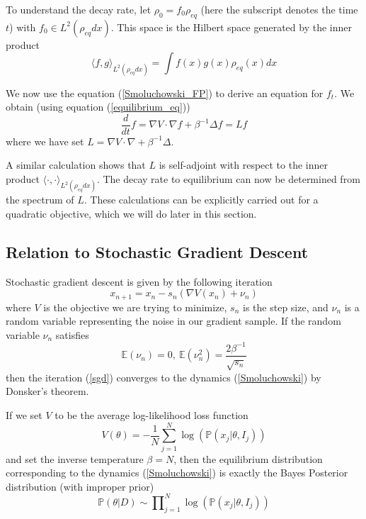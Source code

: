 To understand the decay rate, let $\rho_0 = f_0\rho_{eq}$ (here the subscript denotes the time $t$) with $f_0\in L^2(\rho_{eq}dx)$.
This space is the Hilbert space generated by the inner product
\begin{equation}
 \langle f,g\rangle_{L^2(\rho_{eq}dx)} = \int f(x)g(x)\rho_{eq}(x)dx
\end{equation}

We now use the equation (\ref{Smoluchowski_FP}) to derive an equation for $f_t$. We obtain (using equation (\ref{equilibrium_eq}))
\begin{equation}
 \frac{d}{dt} f = \nabla V\cdot\nabla f + \beta^{-1}\Delta f = Lf
\end{equation}
where we have set $L = \nabla V\cdot\nabla  + \beta^{-1}\Delta$.

A similar calculation shows that $L$ is self-adjoint with respect to the inner product 
$\langle \cdot, \cdot\rangle_{L^2(\rho_{eq}dx)}$. The decay rate to equilibrium can now be determined from 
the spectrum of $L$. These calculations can be explicitly carried out for a quadratic objective, which we will
do later in this section.

\subsection{Relation to Stochastic Gradient Descent}
Stochastic gradient descent is given by the following iteration
\begin{equation}\label{sgd}
 x_{n+1} = x_n - s_n(\nabla V(x_n) + \nu_n)
\end{equation}
where $V$ is the objective we are trying to minimize, $s_n$ is the step size, and $\nu_n$ is a random variable
representing the noise in our gradient sample. If the random variable $\nu_n$ satisfies
\begin{equation}
 \mathbb{E}(\nu_n) = 0,~\mathbb{E}(\nu_n^2) = \frac{2\beta^{-1}}{\sqrt{s_n}}
\end{equation}
then the iteration (\ref{sgd}) converges to the dynamics (\ref{Smoluchowski}) by Donsker's theorem.

If we set $V$ to be the average log-likelihood loss function
\begin{equation}
 V(\theta) = -\frac{1}{N}\displaystyle\sum_{j = 1}^N \log(\mathbb{P}(x_j|\theta,I_j))
\end{equation}
and set the inverse temperature $\beta = N$, then the equilibrium distribution corresponding to the
dynamics (\ref{Smoluchowski}) is exactly the Bayes Posterior distribution (with improper prior)
$$\mathbb{P}(\theta|D) \sim \mathbb\prod_{j = 1}^N \log(\mathbb{P}(x_j|\theta,I_j))$$

